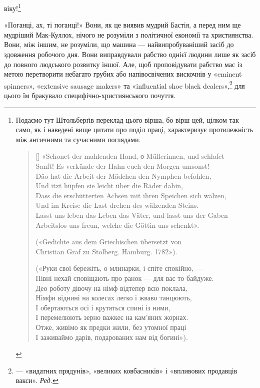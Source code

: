 віку!\footnote{
Подаємо тут Штольберґів переклад цього вірша, бо вірш цей,
цілком так само, як і наведені вище цитати про поділ праці, характеризує
протилежність між античними та сучасними поглядами.

\settowidth{\versewidth}{Lasst uns leben das Leben das Väter, und lasst uns der Gaben}
\begin{verse}[\versewidth]
«Schonet der mahlenden Hand, о Müllerinnen, und schlafet\\
Sanft! Es verkünde der Hahn euch den Morgen umsonst!\\
Däo hat die Arbeit der Mädchen den Nymphen befohlen,\\
Und itzt hüpfen sie leicht über die Räder dahin,\\
Dass die erschütterten Achsen mit ihren Speichen sich wälzen,\\
Und im Kreise die Last drehen des wälzenden Steins.\\
Lasst uns leben das Leben das Väter, und lasst uns der Gaben\\
Arbeitslos uns freun, welche die Göttin uns schenkt».

(«Gedichte aus dem Griechischen übersetzt von\\
Christian Graf zu Stolberg. Hamburg. 1782»).

(«Руки свої бережіть, о млинарки, і спіте спокійно, —\\
Півні нехай сповіщають про ранок — для вас то байдуже.\\
Део роботу дівочу на німф відтепер всю поклала,\\
Німфи віднині на колесах легко і жваво танцюють,\\
І обертаються осі і крутяться спині із ними,\\
І перемелюють зерно важкеє на кам'яних жорнах.\\
Отже, живімо як предки жили, без утомної праці\\
І заживаймо дарів, подарованих нам від богині»).\\
\end{verse}

}

«Поганці, ах, ті поганці!» Вони, як це виявив мудрий Бастія,
а перед ним ще мудріший Мак-Куллох, нічого не розуміли з
політичної економії та християнства. Вони, між іншим, не розуміли,
що машина — найвипробуваніший засіб до здовження робочого
дня. Вони виправдували рабство однієї людини лише як
засіб до повного людського розвитку іншої. Але, щоб проповідувати
рабство мас із метою перетворити небагато грубих або
напівосвічених вискочнів у «eminent spinners», «extensive sausage
makers» та «influential shoe black dealers»,\footnote*{
— «видатних прядунів», «великих ковбасників» і «впливових
продавців вакси». \emph{Ред.}
} для цього їм
бракувало специфічно-християнського почуття.


